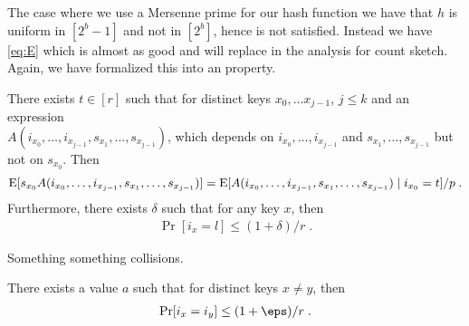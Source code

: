 The case where we use a Mersenne prime for our hash function we
have that $h$ is uniform in $[2^b - 1]$ and not in $[2^b]$, hence 
is not satisfied. Instead we have \cref{eq:E} which is almost as good
and will replace  in the analysis for count sketch.
Again, we have formalized this into an property.
\begin{property}\label{prop:near-independence}
    There exists $t \in [r]$ such that for distinct keys $x_0, \ldots x_{j - 1}$, $j \le k$
    and an expression \\$A(i_{x_0}, \ldots, i_{x_{j - 1}}, s_{x_1}, \ldots, s_{x_{j - 1}})$,
    which depends on $i_{x_0}, \ldots, i_{x_{j - 1}}$ and $s_{x_1}, \ldots, s_{x_{j - 1}}$
    but not on $s_{x_0}$. Then
    \begin{align}\label{eq:near-independence}
        \operatorname*{E}[s_{x_0} A(i_{x_0}, \ldots, i_{x_{j - 1}}, s_{x_1}, \ldots, s_{x_{j - 1}})]
            = \operatorname*{E}[A(i_{x_0}, \ldots, i_{x_{j - 1}}, s_{x_1}, \ldots, s_{x_{j - 1}}) \mid i_{x_0} = t]/p \; .
    \end{align}
    Furthermore, there exists $\delta$ such that for any key $x$, then
    \begin{align}\label{eq:prob-special-value}
        \Pr[i_x = l] \le (1 + \delta)/r \; .
    \end{align}
\end{property}

Something something collisions.
\begin{property}\label{prop:collision}
    There exists a value $a$ such that for distinct keys $x \neq y$,
    then
    \begin{align}\label{eq:collision}
        \Pr[i_x = i_y] \le (1 + \eps)/r\; .
    \end{align}
\end{property}

